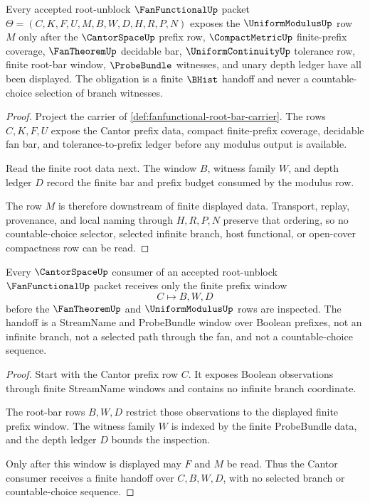 \begin{theorem}
\label{thm:fanfunctional-root-uniform-modulus-obligation}
Every accepted root-unblock $\FanFunctionalUp$ packet $\Theta=(C,K,F,U,M,B,W,D,H,R,P,N)$ exposes the $\UniformModulusUp$ row $M$ only after the $\CantorSpaceUp$ prefix row, $\CompactMetricUp$ finite-prefix coverage, $\FanTheoremUp$ decidable bar, $\UniformContinuityUp$ tolerance row, finite root-bar window, $\ProbeBundle$ witnesses, and unary depth ledger have all been displayed. The obligation is a finite $\BHist$ handoff and never a countable-choice selection of branch witnesses.
\end{theorem}
\begin{proof}
Project the carrier of \autoref{def:fanfunctional-root-bar-carrier}. The rows $C,K,F,U$ expose the Cantor prefix data, compact finite-prefix coverage, decidable fan bar, and tolerance-to-prefix ledger before any modulus output is available.

Read the finite root data next. The window $B$, witness family $W$, and depth ledger $D$ record the finite bar and prefix budget consumed by the modulus row.

The row $M$ is therefore downstream of finite displayed data. Transport, replay, provenance, and local naming through $H,R,P,N$ preserve that ordering, so no countable-choice selector, selected infinite branch, host functional, or open-cover compactness row can be read.
\end{proof}

\begin{theorem}
\label{thm:fanfunctional-root-cantor-window-handoff}
Every $\CantorSpaceUp$ consumer of an accepted root-unblock $\FanFunctionalUp$ packet receives only the finite prefix window
$$
C \longmapsto B,W,D
$$
before the $\FanTheoremUp$ and $\UniformModulusUp$ rows are inspected. The handoff is a StreamName and ProbeBundle window over Boolean prefixes, not an infinite branch, not a selected path through the fan, and not a countable-choice sequence.
\end{theorem}
\begin{proof}
Start with the Cantor prefix row $C$. It exposes Boolean observations through finite StreamName windows and contains no infinite branch coordinate.

The root-bar rows $B,W,D$ restrict those observations to the displayed finite prefix window. The witness family $W$ is indexed by the finite ProbeBundle data, and the depth ledger $D$ bounds the inspection.

Only after this window is displayed may $F$ and $M$ be read. Thus the Cantor consumer receives a finite handoff over $C,B,W,D$, with no selected branch or countable-choice sequence.
\end{proof}

